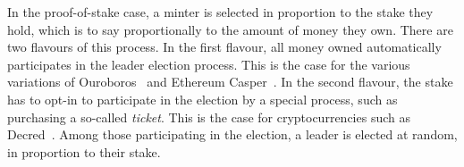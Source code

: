 
In the proof-of-stake case, a minter is selected in proportion to the stake they
hold, which is to say proportionally to the amount of money they own. There are
two flavours of this process. In the first flavour, all money owned automatically participates in the leader election
process. This is the case for the various variations of Ouroboros~\cite{ouroboros}
and Ethereum Casper~\cite{casper}. In the second flavour, the stake has to opt-in to participate in
the election by a special process, such as purchasing a so-called \emph{ticket}. This is the case for cryptocurrencies such as
Decred~\cite{decred}. Among those participating in the election, a leader is
elected at random, in proportion to their stake.

